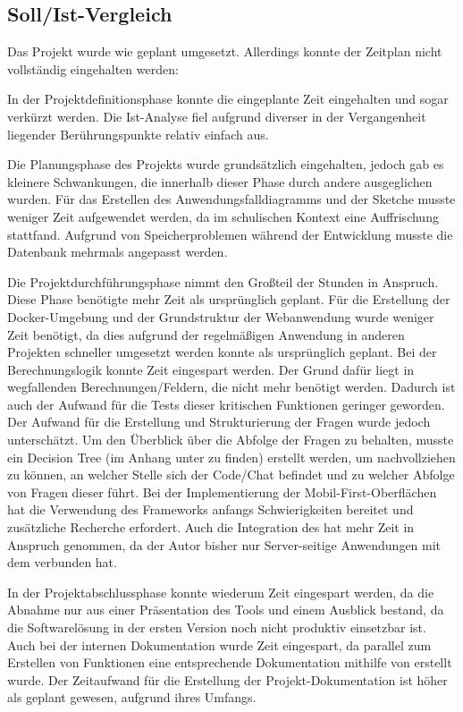 \subsection{Soll/Ist-Vergleich}
\label{sec:Abschlussphase:Soll/Ist-Vergleich}

Das Projekt wurde wie geplant umgesetzt. Allerdings konnte der Zeitplan nicht vollständig eingehalten werden:

In der Projektdefinitionsphase konnte die eingeplante Zeit eingehalten und sogar verkürzt werden. Die Ist-Analyse fiel aufgrund diverser in der Vergangenheit liegender Berührungspunkte relativ einfach aus.

Die Planungsphase des Projekts wurde grundsätzlich eingehalten, jedoch gab es kleinere Schwankungen, die innerhalb dieser Phase durch andere ausgeglichen wurden. Für das Erstellen des Anwendungsfalldiagramms und der Sketche musste weniger Zeit aufgewendet werden, da im schulischen Kontext eine Auffrischung stattfand. Aufgrund von Speicherproblemen während der Entwicklung musste die Datenbank mehrmals angepasst werden.

Die Projektdurchführungsphase nimmt den Großteil der Stunden in Anspruch. Diese Phase benötigte mehr Zeit als ursprünglich geplant. Für die Erstellung der Docker-Umgebung und der Grundstruktur der Webanwendung wurde weniger Zeit benötigt, da dies aufgrund der regelmäßigen Anwendung in anderen Projekten schneller umgesetzt werden konnte als ursprünglich geplant. Bei der Berechnungslogik konnte Zeit eingespart werden. Der Grund dafür liegt in wegfallenden Berechnungen/Feldern, die nicht mehr benötigt werden. Dadurch ist auch der Aufwand für die Tests dieser kritischen Funktionen geringer geworden. Der Aufwand für die Erstellung und Strukturierung der Fragen wurde jedoch unterschätzt. Um den Überblick über die Abfolge der Fragen zu behalten, musste ein Decision Tree (im Anhang unter  zu finden) erstellt werden, um nachvollziehen zu können, an welcher Stelle sich der Code/Chat befindet und zu welcher Abfolge von Fragen dieser führt. Bei der Implementierung der Mobil-First-Oberflächen hat die Verwendung des Frameworks  anfangs Schwierigkeiten bereitet und zusätzliche Recherche erfordert. Auch die Integration des  hat mehr Zeit in Anspruch genommen, da der Autor bisher nur Server-seitige Anwendungen mit dem  verbunden hat. 

In der Projektabschlussphase konnte wiederum Zeit eingespart werden, da die Abnahme nur aus einer Präsentation des Tools und einem Ausblick bestand, da die Softwarelösung in der ersten Version noch nicht produktiv einsetzbar ist. Auch bei der internen Dokumentation wurde Zeit eingespart, da parallel zum Erstellen von Funktionen eine entsprechende Dokumentation mithilfe von  erstellt wurde. Der Zeitaufwand für die Erstellung der Projekt-Dokumentation ist höher als geplant gewesen, aufgrund ihres Umfangs.

